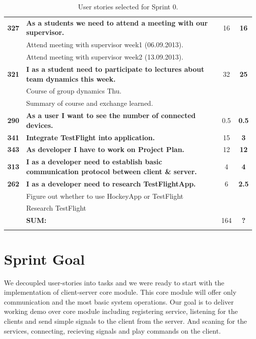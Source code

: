 \begin{longtable}{cp{8cm}cc}
\textbf{327} 	& {\bf As a students we need to attend a meeting with our supervisor. } 	& 		16	& \textbf{16} \\
				& Attend meeting with supervisor week1 (06.09.2013).	&  &  \\
				& Attend meeting with supervisor week2 (13.09.2013).	&  &  \\

\textbf{321} 	& {\bf I as a student need to participate to lectures about team dynamics this week. } 	& 		32	& \textbf{25} \\
				& Course of group dynamics Thu.	&  &  \\
				& Summary of course and exchange learned.	&  &  \\
				
\textbf{290} 	& {\bf As a user I want to see the number of connected devices. } 	& 		0.5	& \textbf{0.5} \\

\textbf{341} 	& {\bf Integrate TestFlight into application. } 	& 		15	& \textbf{3} \\

\textbf{343} 	& {\bf As developer I have to work on Project Plan.} 	& 		12	& \textbf{12} \\

\textbf{313} 	& {\bf I as a developer need to establish basic communication protocol between client \& server.} 	& 		4	& \textbf{4} \\

\textbf{262} 	& {\bf I as a developer need to research TestFlightApp. } 	& 		6	& \textbf{2.5} \\
				& Figure out whether to use HockeyApp or TestFlight&  &  \\
				& Research TestFlight	&  &  \\
				
\hline
				& \textbf{SUM:}		&		164	& \textbf{?}
 \\																			
\bottomrule[1mm]
\caption{User stories selected for Sprint 0. }
\label{tab:sprint0stories}
\end{longtable}

\section{Sprint Goal}
We decoupled user-stories into tasks and we were ready to start with the implementation of client-server core module.
This core module will offer only communication and the most basic system operations. 
Our goal is to deliver working demo over core module including registering service, listening for the clients and send simple signals to the client from the server.
And scaning for the services, connecting, recieving signals and play commands on the client. 

